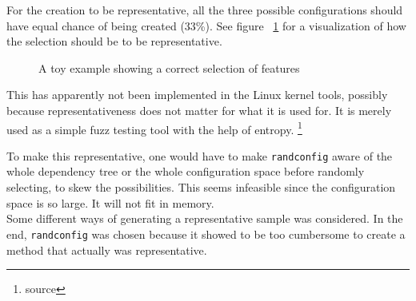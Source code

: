 \documentclass[a4paper,11pt]{report}
\newcommand{\textcode}[1]{
    \fboxsep=1pt
    \texttt{\colorbox{gray!20}{#1}}
}
\newcommand{\figa}{
    \begin{figure}[!htpb]
    \centering
}
\newcommand{\figb}[2]{
    \caption{#1}
    \label{#2}
    \end{figure}
}
\begin{document}
For the creation to be representative, all the three possible configurations 
should have equal chance of being created (33\%). See figure 
~\ref{randconfigtoy33} for a visualization of how the selection should be to be 
representative.

\figa
\figb{A toy example showing a correct selection of features}{randconfigtoy33}

This has apparently not been implemented in the Linux kernel tools, possibly 
because representativeness does not matter for what it is used for. It is 
merely used as a simple fuzz testing tool with the help of entropy.
    \footnote{source}

To make this representative, one would have to make \texttt{randconfig} aware of
the whole dependency tree or the whole configuration space before randomly 
selecting, to skew the possibilities. This seems infeasible since the 
configuration space is so large. It will not fit in memory.
\\

Some different ways of generating a representative sample was considered. In 
the end, \texttt{randconfig} was chosen because it showed to be too cumbersome 
to create a method that actually was representative. 
\end{document}
